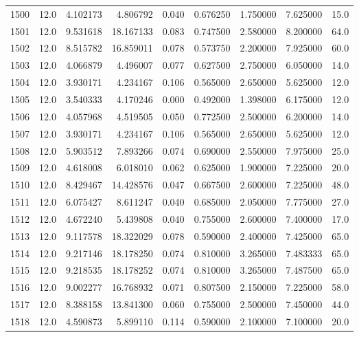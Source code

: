\begin{tabular}{lrrrrrrrr}
1500 &   12.0 &   4.102173 &   4.806792 &  0.040 &  0.676250 &  1.750000 &   7.625000 &   15.0 \\
1501 &   12.0 &   9.531618 &  18.167133 &  0.083 &  0.747500 &  2.580000 &   8.200000 &   64.0 \\
1502 &   12.0 &   8.515782 &  16.859011 &  0.078 &  0.573750 &  2.200000 &   7.925000 &   60.0 \\
1503 &   12.0 &   4.066879 &   4.496007 &  0.077 &  0.627500 &  2.750000 &   6.050000 &   14.0 \\
1504 &   12.0 &   3.930171 &   4.234167 &  0.106 &  0.565000 &  2.650000 &   5.625000 &   12.0 \\
1505 &   12.0 &   3.540333 &   4.170246 &  0.000 &  0.492000 &  1.398000 &   6.175000 &   12.0 \\
1506 &   12.0 &   4.057968 &   4.519505 &  0.050 &  0.772500 &  2.500000 &   6.200000 &   14.0 \\
1507 &   12.0 &   3.930171 &   4.234167 &  0.106 &  0.565000 &  2.650000 &   5.625000 &   12.0 \\
1508 &   12.0 &   5.903512 &   7.893266 &  0.074 &  0.690000 &  2.550000 &   7.975000 &   25.0 \\
1509 &   12.0 &   4.618008 &   6.018010 &  0.062 &  0.625000 &  1.900000 &   7.225000 &   20.0 \\
1510 &   12.0 &   8.429467 &  14.428576 &  0.047 &  0.667500 &  2.600000 &   7.225000 &   48.0 \\
1511 &   12.0 &   6.075427 &   8.611247 &  0.040 &  0.685000 &  2.050000 &   7.775000 &   27.0 \\
1512 &   12.0 &   4.672240 &   5.439808 &  0.040 &  0.755000 &  2.600000 &   7.400000 &   17.0 \\
1513 &   12.0 &   9.117578 &  18.322029 &  0.078 &  0.590000 &  2.400000 &   7.425000 &   65.0 \\
1514 &   12.0 &   9.217146 &  18.178250 &  0.074 &  0.810000 &  3.265000 &   7.483333 &   65.0 \\
1515 &   12.0 &   9.218535 &  18.178252 &  0.074 &  0.810000 &  3.265000 &   7.487500 &   65.0 \\
1516 &   12.0 &   9.002277 &  16.768932 &  0.071 &  0.807500 &  2.150000 &   7.225000 &   58.0 \\
1517 &   12.0 &   8.388158 &  13.841300 &  0.060 &  0.755000 &  2.500000 &   7.450000 &   44.0 \\
1518 &   12.0 &   4.590873 &   5.899110 &  0.114 &  0.590000 &  2.100000 &   7.100000 &   20.0 \\

\end{tabular}
